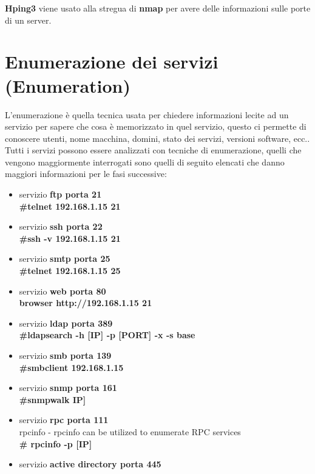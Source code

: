 \documentclass[a4paper,12pt]{article}
\begin{document}
\textbf{ Hping3}\cite{hping3} viene usato alla stregua di \textbf{nmap}\cite{nmap} per avere delle informazioni sulle porte di un server.

\section{ Enumerazione  dei servizi (Enumeration)}

L'enumerazione è quella tecnica usata per chiedere informazioni lecite ad un servizio per sapere che cosa è memorizzato in quel servizio, questo ci permette di conoscere utenti,  nome macchina, domini, stato dei servizi, versioni software, ecc.. \\
Tutti i servizi possono essere analizzati con tecniche di enumerazione, quelli che vengono maggiormente interrogati sono quelli di seguito elencati che danno maggiori informazioni per le fasi successive:
\begin{itemize}

    \item servizio\textbf{ ftp porta 21} \\
        \textbf{ \#telnet  192.168.1.15 21}
    \item servizio \textbf{ssh porta 22} \\
        \textbf{ \#ssh -v 192.168.1.15 21}
    \item servizio \textbf{smtp porta 25} \\
        \textbf{ \#telnet  192.168.1.15 25}
     \item servizio \textbf{web porta 80} \\
        \textbf{ browser http://192.168.1.15 21}
    \item servizio \textbf{ldap porta 389} \\
        \textbf{ \#ldapsearch -h [IP] -p [PORT] -x -s base}
    \item servizio\textbf{ smb porta 139} \\
        \textbf{ \#smbclient 192.168.1.15}
    \item servizio\textbf{ snmp porta 161} \\
         \textbf{ \#snmpwalk IP]}
     \item servizio\textbf{ rpc porta 111} \\
        rpcinfo - rpcinfo can be utilized to enumerate RPC services \\
        \textbf{ \# rpcinfo -p [IP]}
    \item servizio\textbf{ active directory porta 445}
\end{itemize}
\end{document}
